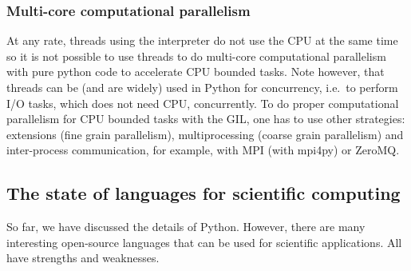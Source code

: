\subsubsection{Multi-core computational parallelism}

At any rate, threads using the interpreter do not use the CPU at the same time
so it is not possible to use threads to do multi-core computational parallelism
with pure python code to accelerate CPU bounded tasks.
%
Note however, that threads can be (and are widely) used in Python for
concurrency, i.e.\ to perform I/O tasks, which does not need CPU, concurrently.
%
To do proper computational parallelism for CPU bounded tasks with the GIL, one
has to use other strategies: extensions (fine grain parallelism),
multiprocessing (coarse grain parallelism) and inter-process communication, for
example, with MPI (with mpi4py) or ZeroMQ.



\subsection{The state of languages for scientific computing}

So far, we have discussed the details of Python. However, there are many
interesting open-source languages that can be used for scientific applications.
All have strengths and weaknesses.

